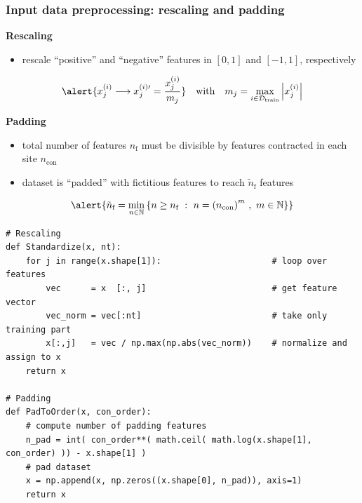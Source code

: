 \documentclass[xcolor=table,8pt]{beamer}
\begin{document}
    
    \begin{frame}[t,fragile]
        \frametitle{Input data preprocessing: rescaling and padding}
        
        \textbf{Rescaling}
        \begin{itemize}
            \item rescale ``positive'' and ``negative'' features in \( [0,1] \) and \( [-1,1] \), respectively
        \end{itemize}

        \begin{equation}
            \alert{
                x^{(i)}_{j}
                \longrightarrow
                x^{(i)\prime}_{j}
                =
                \frac{x^{(i)}_{j}}{m_j}
            }
            \quad \text{with} \quad
            m_{j}
            =
            \max_{i\in \mathcal{D}_{\mathrm{train}}} \abs{x^{(i)}_{j}}
        \end{equation}
        
        \textbf{Padding}
        \begin{itemize}
            \item total number of features \( n_{\text{f}} \) must be divisible by features contracted in each site \( n_{\text{con}} \)
            \item dataset is ``padded'' with fictitious features to reach \( \tilde{n}_{\text{f}} \) features
        \end{itemize}
        
        \begin{equation}
            \alert{
                \tilde{n}_{\text{f}}
                =
                \min_{n\in\mathbb{N}}
                \qty{n \ge n_{\text{f}} \ : \ n = \qty(n_{\text{con}})^{m} \ , \ m \in \mathbb{N} }
            }
        \end{equation}
        
        \begin{lstlisting}[style=mypython, numbers=none, frame=single, aboveskip=5pt, belowskip=0pt, backgroundcolor=\color{white},rulecolor=\color{beamer@blendedblue},framerule=0.1pt]
# Rescaling
def Standardize(x, nt):
    for j in range(x.shape[1]):                      # loop over features
        vec      = x  [:, j]                         # get feature vector
        vec_norm = vec[:nt]                          # take only training part
        x[:,j]   = vec / np.max(np.abs(vec_norm))    # normalize and assign to x
    return x

# Padding
def PadToOrder(x, con_order):
    # compute number of padding features
    n_pad = int( con_order**( math.ceil( math.log(x.shape[1], con_order) )) - x.shape[1] )
    # pad dataset
    x = np.append(x, np.zeros((x.shape[0], n_pad)), axis=1)
    return x
        \end{lstlisting}
    \end{frame}
    
\end{document}
